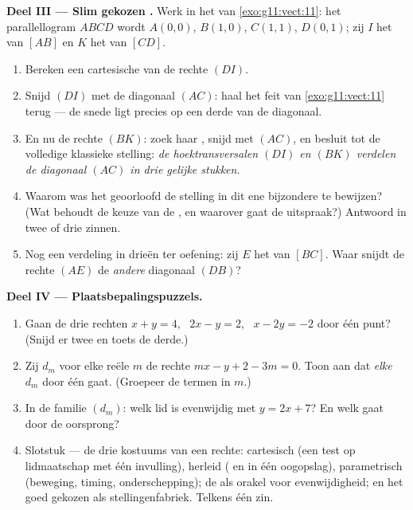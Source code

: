 \begin{problem}
\medskip
\noindent\textbf{Deel III --- Slim gekozen .}
Werk in het  van \cref{exo:g11:vect:11}: het parallellogram
$ABCD$ wordt $A(0,0)$, $B(1,0)$, $C(1,1)$, $D(0,1)$; zij $I$ het  van
$[AB]$ en $K$ het  van $[CD]$.
\begin{enumerate}[resume]
  \item Bereken een cartesische  van de rechte $(DI)$.
  \item Snijd $(DI)$ met de diagonaal $(AC)$: haal het feit van
        \cref{exo:g11:vect:11} terug --- de snede ligt precies op een derde
        van de diagonaal.
  \item En nu de rechte $(BK)$: zoek haar , snijd met $(AC)$, en
        besluit tot de volledige klassieke stelling: \emph{de hoektransversalen
        $(DI)$ en $(BK)$ verdelen de diagonaal $(AC)$ in drie gelijke
        stukken}.
  \item Waarom was het geoorloofd de stelling in dit ene bijzondere
         te bewijzen? (Wat behoudt de keuze van de ,
        en waarover gaat de uitspraak?) Antwoord in twee of drie zinnen.
  \item Nog een verdeling in drieën ter oefening: zij $E$ het  van
        $[BC]$. Waar snijdt de rechte $(AE)$ de \emph{andere} diagonaal
        $(DB)$?
\end{enumerate}

\medskip
\noindent\textbf{Deel IV --- Plaatsbepalingspuzzels.}
\begin{enumerate}[resume]
  \item Gaan de drie rechten $x + y = 4$, \ $2x - y = 2$, \ $x - 2y = -2$
        door één punt? (Snijd er twee en toets de derde.)
  \item Zij $d_m$ voor elke reële $m$ de rechte $mx - y + 2 - 3m = 0$. Toon
        aan dat \emph{elke} $d_m$ door één  gaat. (Groepeer de
        termen in $m$.)
  \item In de familie $(d_m)$: welk lid is evenwijdig met $y = 2x + 7$? En
        welk gaat door de oorsprong?
  \item Slotstuk --- de drie kostuums van een rechte: cartesisch (een test op
        lidmaatschap met één invulling), herleid ( en
         in één oogopslag), parametrisch (beweging, timing,
        onderschepping); de  als orakel voor evenwijdigheid; en het
        goed gekozen  als stellingenfabriek. Telkens één zin.
\end{enumerate}
\end{problem}
